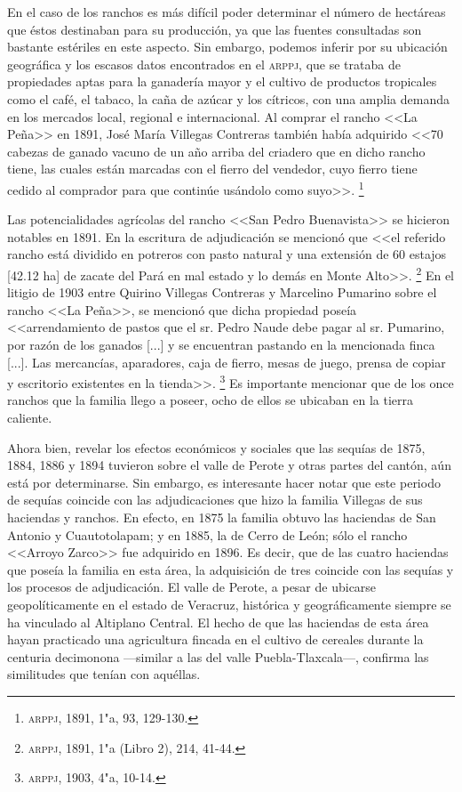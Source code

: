 \documentclass[14pt,twoside,final]{extbook} %
\let\oldfootnote\footnote
\renewcommand\footnote[1]{%
\oldfootnote{\hspace{1mm}#1}}
\begin{document}
En el caso de los ranchos es más difícil poder determinar el número de hectáreas que éstos destinaban para su producción, ya que las fuentes consultadas son bastante estériles en este aspecto. Sin embargo, podemos inferir por su ubicación geográfica y los escasos datos encontrados en el \textsc{arppj}, que se trataba de propiedades aptas para la ganadería mayor y el cultivo de productos tropicales como el café, el tabaco, la caña de azúcar y los cítricos, con una amplia demanda en los mercados local, regional e internacional. Al comprar el rancho <<La Peña>> en 1891, José María Villegas Contreras también había adquirido <<70 cabezas de ganado vacuno de un año arriba del
criadero que en dicho rancho tiene, las cuales están marcadas con el fierro del vendedor, cuyo fierro tiene cedido al comprador para que continúe usándolo como suyo>>.\footnote{\textsc{arppj}, 1891, 1"a, 93, 129-130.}

Las potencialidades agrícolas del rancho <<San Pedro Buenavista>> se hicieron notables en 1891. En la escritura de adjudicación se mencionó que <<el referido rancho está dividido en potreros con pasto natural y una extensión de 60 estajos [42.12 ha] de zacate del Pará en mal estado y lo demás en Monte Alto>>.\footnote{\textsc{arppj}, 1891, 1"a (Libro 2), 214, 41-44.} En el litigio de 1903 entre Quirino Villegas Contreras y Marcelino Pumarino sobre el rancho <<La Peña>>, se mencionó que dicha propiedad poseía <<arrendamiento de pastos que el sr. Pedro Naude debe pagar al sr. Pumarino, por razón de los ganados [...] y se encuentran pastando en la mencionada finca [...]. Las mercancías, aparadores, caja de fierro, mesas de juego, prensa de copiar y escritorio existentes en la tienda>>.\footnote{\textsc{arppj}, 1903, 4"a, 10-14.} Es importante mencionar que de los once ranchos que la familia llego a poseer, ocho de ellos se ubicaban en la tierra caliente.

Ahora bien, revelar los efectos económicos y sociales que las sequías de 1875, 1884, 1886 y 1894 tuvieron sobre el valle de Perote y otras partes del cantón, aún está por determinarse. Sin embargo, es interesante hacer notar que este periodo de sequías coincide con las adjudicaciones que hizo la familia Villegas de sus haciendas y ranchos. En efecto, en 1875 la familia obtuvo las haciendas de San Antonio y Cuautotolapam; y en 1885, la de Cerro de León; sólo el rancho <<Arroyo Zarco>> fue adquirido en 1896. Es decir, que de las cuatro haciendas que poseía la familia en esta área, la adquisición de tres coincide con las sequías y los procesos de adjudicación. El valle de Perote, a pesar de ubicarse geopolíticamente en el estado de Veracruz, histórica y geográficamente siempre se ha vinculado al Altiplano Central. El hecho de que las haciendas de esta área hayan practicado una agricultura fincada en el cultivo de cereales durante la centuria decimonona ---similar a las del valle Puebla-Tlaxcala---, confirma las similitudes que tenían con aquéllas.
\end{document}
